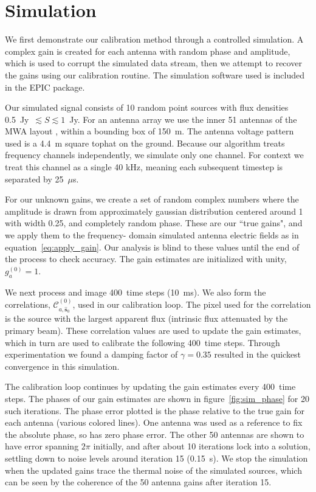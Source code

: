 \documentclass[a4paper,fleqn,usenatbib]{mnras}
\newcommand{\spix}{\ensuremath{\hat{\mathbf{s}}_{0}}}
\newcommand{\Cna}[1][n]{\ensuremath{\mathcal{C}^{(#1)}_{a,\spix}}}
\newcommand{\caliter}{400}
\newcommand{\damp}{\ensuremath{\gamma}}
\begin{document}
\section{Simulation}\label{sec:sim}
We first demonstrate our calibration method through a controlled simulation. A complex gain is 
created for each antenna with random phase and amplitude, which is used to corrupt the 
simulated data stream, then we attempt to recover the gains using our calibration routine. The 
simulation software used is included in the EPIC package.

Our simulated signal consists of 10 random point sources with flux densities 0.5~Jy~$\lesssim 
S \lesssim 1$~Jy. For an antenna array we use the inner 51 antennas of the MWA layout 
\citep{bea12}, within a bounding box of 150~m. The antenna voltage pattern used is a 4.4~m 
square tophat on the ground. Because our algorithm treats frequency channels independently, 
we simulate only one channel. For context we treat this channel as a single 40 kHz, meaning 
each subsequent timestep is separated by 25~$\mu$s.

For our unknown gains, we create a set of random complex numbers where the amplitude is 
drawn from approximately gaussian distribution centered around 1 with width 0.25, and 
completely random phase. These are our ``true gains", and we apply them to the frequency-
domain simulated antenna electric fields as in equation~\ref{eq:apply_gain}. Our analysis is 
blind to these values until the end of the process to check accuracy. The gain estimates are 
initialized with unity, $g^{(0)}_a=1$.

We next process and image \caliter~time steps (10~ms). We also form the correlations, 
\Cna[0], used in our calibration loop. The pixel used for the correlation is the source with the 
largest apparent flux (intrinsic flux attenuated by the primary beam). These correlation values 
are used to update the gain estimates, which in turn are used to calibrate the following 
\caliter~time steps. Through experimentation we found a damping factor of $\damp=0.35$ 
resulted in the quickest convergence in this simulation.

The calibration loop continues by updating the gain estimates every \caliter~time steps. The 
phases of our gain estimates are shown in figure~\ref{fig:sim_phase} for 20 such iterations. 
The phase error plotted is the phase relative to the true gain for each antenna (various colored 
lines). One antenna was used as a reference to fix the absolute phase, so has zero phase 
error. The other 50 antennas are shown to have error spanning $2\pi$ initially, and after about 
10 iterations lock into a solution, settling down to noise levels around iteration 15 (0.15~s). We 
stop the simulation when the updated gains trace the thermal noise of the simulated sources, 
which can be seen by the coherence of the 50 antenna gains after iteration 15.
\end{document}
